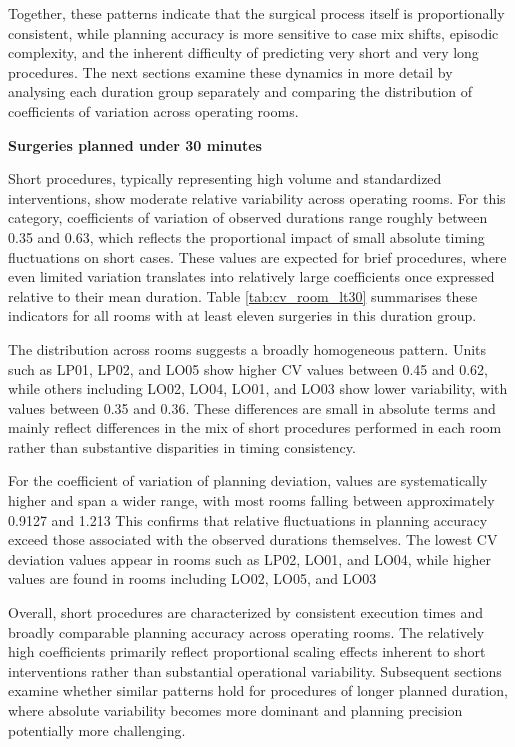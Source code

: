 \documentclass[
]{article}
\begin{document}
Together, these patterns indicate that the surgical process itself is
proportionally consistent, while planning accuracy is more sensitive to
case mix shifts, episodic complexity, and the inherent difficulty of
predicting very short and very long procedures. The next sections
examine these dynamics in more detail by analysing each duration group
separately and comparing the distribution of coefficients of variation
across operating rooms.

\vspace{1em}

\noindent\textbf{Surgeries planned under 30 minutes} \vspace{0.5em}

Short procedures, typically representing high volume and standardized
interventions, show moderate relative variability across operating
rooms. For this category, coefficients of variation of observed
durations range roughly between 0.35 and 0.63, which reflects the
proportional impact of small absolute timing fluctuations on short
cases. These values are expected for brief procedures, where even
limited variation translates into relatively large coefficients once
expressed relative to their mean duration. Table \ref{tab:cv_room_lt30}
summarises these indicators for all rooms with at least eleven surgeries
in this duration group.

The distribution across rooms suggests a broadly homogeneous pattern.
Units such as LP01, LP02, and LO05 show higher CV values between 0.45
and 0.62, while others including LO02, LO04, LO01, and LO03 show lower
variability, with values between 0.35 and 0.36. These differences are
small in absolute terms and mainly reflect differences in the mix of
short procedures performed in each room rather than substantive
disparities in timing consistency.

For the coefficient of variation of planning deviation, values are
systematically higher and span a wider range, with most rooms falling
between approximately 0.9127 and 1.213 This confirms that relative
fluctuations in planning accuracy exceed those associated with the
observed durations themselves. The lowest CV deviation values appear in
rooms such as LP02, LO01, and LO04, while higher values are found in
rooms including LO02, LO05, and LO03

Overall, short procedures are characterized by consistent execution
times and broadly comparable planning accuracy across operating rooms.
The relatively high coefficients primarily reflect proportional scaling
effects inherent to short interventions rather than substantial
operational variability. Subsequent sections examine whether similar
patterns hold for procedures of longer planned duration, where absolute
variability becomes more dominant and planning precision potentially
more challenging.
\end{document}
